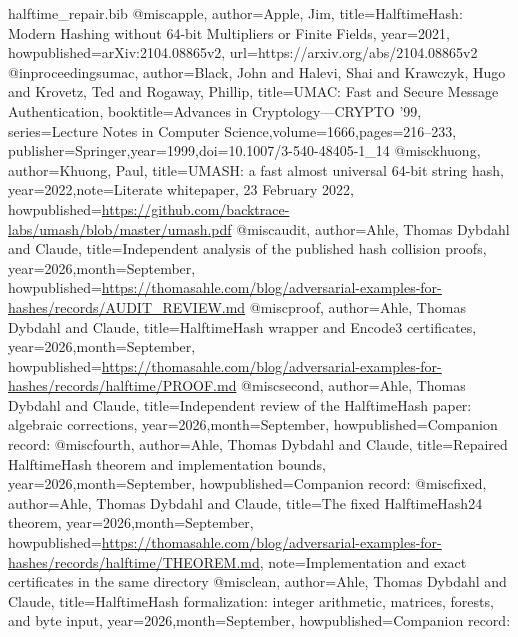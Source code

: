 \begin{filecontents*}[overwrite]{halftime_repair.bib}
@misc{apple,
 author={Apple, Jim},
 title={{HalftimeHash}: Modern Hashing without 64-bit Multipliers or Finite Fields},
 year={2021}, howpublished={arXiv:2104.08865v2},
 url={https://arxiv.org/abs/2104.08865v2}}
@inproceedings{umac,
 author={Black, John and Halevi, Shai and Krawczyk, Hugo and Krovetz, Ted and Rogaway, Phillip},
 title={{UMAC}: Fast and Secure Message Authentication},
 booktitle={Advances in Cryptology---CRYPTO '99},
 series={Lecture Notes in Computer Science},volume={1666},pages={216--233},
 publisher={Springer},year={1999},doi={10.1007/3-540-48405-1_14}}
@misc{khuong,
 author={Khuong, Paul},
 title={{UMASH}: a fast almost universal 64-bit string hash},
 year={2022},note={Literate whitepaper, 23 February 2022},
 howpublished={\url{https://github.com/backtrace-labs/umash/blob/master/umash.pdf}}}
@misc{audit,
 author={Ahle, Thomas Dybdahl and {Claude}},
 title={Independent analysis of the published hash collision proofs},
 year={2026},month={September},
 howpublished={\url{https://thomasahle.com/blog/adversarial-examples-for-hashes/records/AUDIT_REVIEW.md}}}
@misc{proof,
 author={Ahle, Thomas Dybdahl and {Claude}},
 title={{HalftimeHash} wrapper and {Encode3} certificates},
 year={2026},month={September},
 howpublished={\url{https://thomasahle.com/blog/adversarial-examples-for-hashes/records/halftime/PROOF.md}}}
@misc{second,
 author={Ahle, Thomas Dybdahl and {Claude}},
 title={Independent review of the {HalftimeHash} paper: algebraic corrections},
 year={2026},month={September},
 howpublished={Companion record: }}
@misc{fourth,
 author={Ahle, Thomas Dybdahl and {Claude}},
 title={Repaired {HalftimeHash} theorem and implementation bounds},
 year={2026},month={September},
 howpublished={Companion record: }}
@misc{fixed,
 author={Ahle, Thomas Dybdahl and {Claude}},
 title={The fixed {HalftimeHash24} theorem},
 year={2026},month={September},
 howpublished={\url{https://thomasahle.com/blog/adversarial-examples-for-hashes/records/halftime/THEOREM.md}},
 note={Implementation and exact certificates in the same directory}}
@misc{lean,
 author={Ahle, Thomas Dybdahl and {Claude}},
 title={{HalftimeHash} formalization: integer arithmetic, matrices, forests, and byte input},
 year={2026},month={September},
 howpublished={Companion record: }}
\end{filecontents*}
\documentclass[11pt,a4paper]{article}
\usepackage[T1]{fontenc}\usepackage[utf8]{inputenc}
